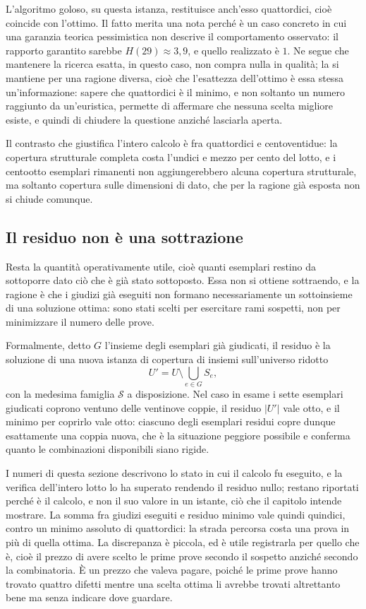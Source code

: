 L'algoritmo goloso, su questa istanza, restituisce anch'esso quattordici, cioè coincide con l'ottimo. Il fatto merita una nota perché è un caso concreto in cui una garanzia teorica pessimistica non descrive il comportamento osservato: il rapporto garantito sarebbe $H(29) \approx 3{,}9$, e quello realizzato è $1$. Ne segue che mantenere la ricerca esatta, in questo caso, non compra nulla in qualità; la si mantiene per una ragione diversa, cioè che l'esattezza dell'ottimo è essa stessa un'informazione: sapere che quattordici è il minimo, e non soltanto un numero raggiunto da un'euristica, permette di affermare che nessuna scelta migliore esiste, e quindi di chiudere la questione anziché lasciarla aperta.

Il contrasto che giustifica l'intero calcolo è fra quattordici e centoventidue: la copertura strutturale completa costa l'undici e mezzo per cento del lotto, e i centootto esemplari rimanenti non aggiungerebbero alcuna copertura strutturale, ma soltanto copertura sulle dimensioni di dato, che per la ragione già esposta non si chiude comunque.

\subsection*{Il residuo non è una sottrazione}

Resta la quantità operativamente utile, cioè quanti esemplari restino da sottoporre dato ciò che è già stato sottoposto. Essa non si ottiene sottraendo, e la ragione è che i giudizi già eseguiti non formano necessariamente un sottoinsieme di una soluzione ottima: sono stati scelti per esercitare rami sospetti, non per minimizzare il numero delle prove.

Formalmente, detto $G$ l'insieme degli esemplari già giudicati, il residuo è la soluzione di una nuova istanza di copertura di insiemi sull'universo ridotto
\begin{equation}
U' = U \setminus \bigcup_{e \in G} S_e ,
\end{equation}
con la medesima famiglia $\mathcal{S}$ a disposizione. Nel caso in esame i sette esemplari giudicati coprono ventuno delle ventinove coppie, il residuo $|U'|$ vale otto, e il minimo per coprirlo vale otto: ciascuno degli esemplari residui copre dunque esattamente una coppia nuova, che è la situazione peggiore possibile e conferma quanto le combinazioni disponibili siano rigide.

I numeri di questa sezione descrivono lo stato in cui il calcolo fu eseguito, e la verifica dell'intero lotto lo ha superato rendendo il residuo nullo; restano riportati perché è il calcolo, e non il suo valore in un istante, ciò che il capitolo intende mostrare. La somma fra giudizi eseguiti e residuo minimo vale quindi quindici, contro un minimo assoluto di quattordici: la strada percorsa costa una prova in più di quella ottima. La discrepanza è piccola, ed è utile registrarla per quello che è, cioè il prezzo di avere scelto le prime prove secondo il sospetto anziché secondo la combinatoria. È un prezzo che valeva pagare, poiché le prime prove hanno trovato quattro difetti mentre una scelta ottima li avrebbe trovati altrettanto bene ma senza indicare dove guardare.
